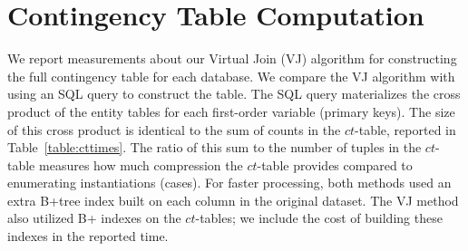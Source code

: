 \documentclass{vldb}
\newcommand{\ct}{\mathit{ct}}
\begin{document}
\begin{table} \centering
\caption{Constructing the full contingency table for each database. Computation times are given in seconds. M = million. N.T. = nontermination.
  \label{table:cttimes}}
\end{table}


\section{Contingency Table Computation}

We report measurements about our Virtual Join (VJ) algorithm for constructing the full contingency table for each database. We compare the VJ algorithm with using an SQL query to construct the table. The SQL query materializes the cross product of the entity tables for each first-order variable (primary keys).  The size of this cross product is identical to the sum of counts in the $\ct$-table, reported in Table~\ref{table:cttimes}. The ratio of this sum to the number of tuples in the $\ct$-table measures how much compression the $\ct$-table provides compared to enumerating instantiations (cases). For faster processing, both methods used an extra B+tree index built on each column in the original dataset. The VJ method also utilized B+ indexes on the $\ct$-tables; we include the cost of building these indexes in the reported time. 
\end{document}
